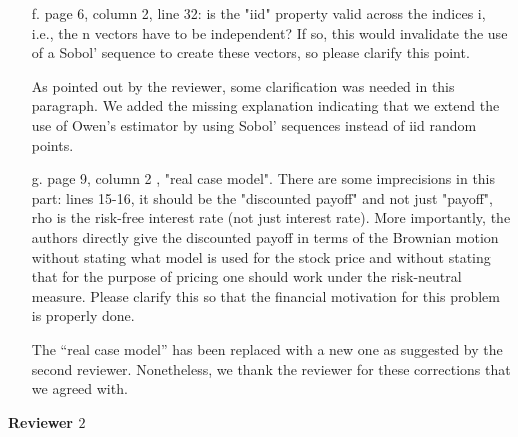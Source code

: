 \documentclass[10pt,a4paper]{article}
\newcommand{\answer}[1]{{\color{blue} #1 }}
\begin{document}
\begin{itemize}
\item[f.] page 6, column 2, line 32: is the "iid" property valid across the indices i, i.e., the n vectors have to be independent? If so, this would invalidate the use of a Sobol' sequence to create these vectors, so please clarify this point.

\answer{As pointed out by the reviewer, some clarification was needed in this paragraph. We added the missing explanation indicating that we extend the use of  Owen's estimator by using Sobol' sequences instead of iid random points.}

\item[g.] page 9, column 2 , "real case model". There are some imprecisions in this part: lines 15-16, it should be the "discounted payoff" and not just "payoff", rho is the risk-free interest rate (not just interest rate). More importantly, the authors directly give the discounted payoff in terms of the Brownian motion without stating what model is used for the stock price and without stating that for the purpose of pricing one should work under the risk-neutral measure. Please clarify this so that the financial motivation for this problem is properly done.

{\color{blue} The ``real case model'' has been replaced with a new one as suggested by the second reviewer. Nonetheless, we thank the reviewer for these corrections that we agreed with.} 
\end{itemize}

\textbf{\large{Reviewer $2$}}
\vspace*{0.5cm}
\end{document}
